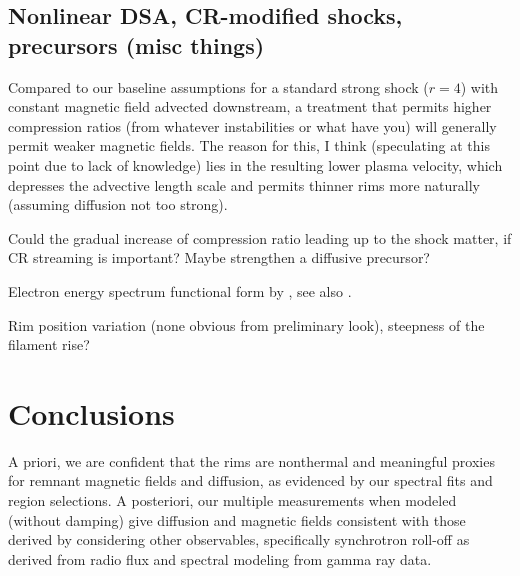 \documentclass[iop, apj, numberedappendix]{emulateapj}
\newcommand*{\mt}{\mathrm}
\newcommand*{\unit}[1]{\;\mt{#1}}  %
\begin{document}
\subsection{Nonlinear DSA, CR-modified shocks, precursors (misc things)}

Compared to our baseline assumptions for a standard strong shock ($r=4$) with
constant magnetic field advected downstream, a treatment that permits higher
compression ratios (from whatever instabilities or what have you) will
generally permit weaker magnetic fields.  The reason for this, I think
(speculating at this point due to lack of knowledge) lies in the resulting
lower plasma velocity, which depresses the advective length scale and permits
thinner rims more naturally (assuming diffusion not too strong).

Could the gradual increase of compression ratio leading up to the shock matter,
if CR streaming is important?  Maybe strengthen a diffusive precursor?

Electron energy spectrum functional form by \citet{zirakashvili2007}, see also
\citet{morlino2009}.

Rim position variation (none obvious from preliminary look), steepness of the
filament rise?



\section{Conclusions}

A priori, we are confident that the rims are nonthermal and meaningful proxies
for remnant magnetic fields and diffusion, as evidenced by our spectral fits
and region selections.
A posteriori, our multiple measurements when modeled (without damping) give
diffusion and magnetic fields consistent with those derived by considering
other observables, specifically synchrotron roll-off as derived from radio flux
and spectral modeling from gamma ray data.
\end{document}
